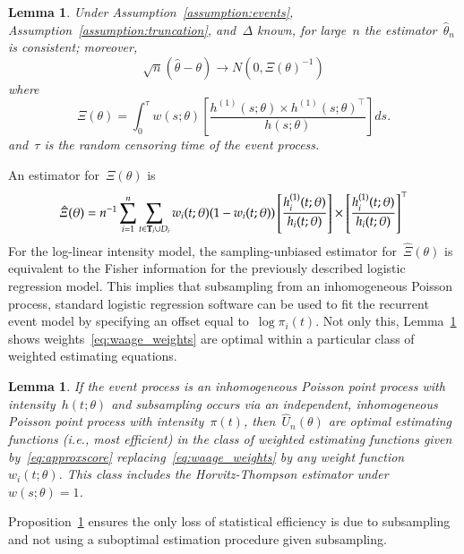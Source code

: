 \documentclass[11pt]{amsart}
\newtheorem{lemma}[thm]{Lemma}
\def\bfT{{\bf T}}
\begin{document}
\begin{lemma} \normalfont
\label{lemma:simpleasym}
Under Assumption~\ref{assumption:events}, Assumption~\ref{assumption:truncation}, and~$\Delta$ known, for large~$n$ the estimator~$\hat \theta_n$ is consistent; moreover,
\[
\sqrt{n} (\hat \theta - \theta) \to N(0, \Xi (\theta)^{-1})
\]
where
\[
  \Xi (\theta) = \int_{0}^{\tau} w(s; \theta) \left[ \frac{h^{(1)}(s;
      \theta) \times  h^{(1)} (s;\theta)^{\top}}{h(s; \theta)} \right]
  ds.
\]
and~$\tau$ is the random censoring time of the event process.
\end{lemma}
An estimator for~$\Xi(\theta)$ is
\begin{equation}
\label{eq:fisher}
  \hat \Xi (\theta) = n^{-1} \sum_{i=1}^n \sum_{t \in \bfT_i \cup D_i}
  w_i(t;\theta) (1-w_i(t;\theta)) \left[ \frac{h_i^{(1)}(t;
      \theta)}{h_i (t; \theta)} \right] \times  \left [
    \frac{h_i^{(1)} (t;\theta)}{h_i(t; \theta)} \right]^\top
\end{equation}
For the log-linear intensity model, the sampling-unbiased estimator for~$\hat \Xi(\theta)$ is equivalent to the Fisher information for the previously described logistic regression model.
This implies that subsampling from an inhomogeneous Poisson process, standard logistic regression software can be used to fit the recurrent event model by specifying an offset equal to~$\log \pi_i (t)$. Not only this, Lemma~\ref{prop:optimal} shows weights~\eqref{eq:waage_weights} are optimal within a particular class of weighted estimating equations.

\begin{lemma} \normalfont
\label{prop:optimal}
If the event process is an inhomogeneous Poisson point process with intensity~$h(t; \theta)$ and subsampling occurs via an independent, inhomogeneous Poisson point process with intensity~$\pi (t)$, then~$\hat U_n (\theta)$ are optimal estimating functions (i.e., most efficient) in the class of weighted estimating functions given by~\eqref{eq:approxscore} replacing~\eqref{eq:waage_weights} by any weight function~$w_i (t; \theta)$. This class includes the Horvitz-Thompson estimator under~$w(s; \theta) = 1$.
\end{lemma}

\noindent Proposition~\ref{prop:optimal} ensures the only loss of statistical efficiency is due to subsampling and not using a suboptimal estimation procedure given subsampling.
\end{document}
